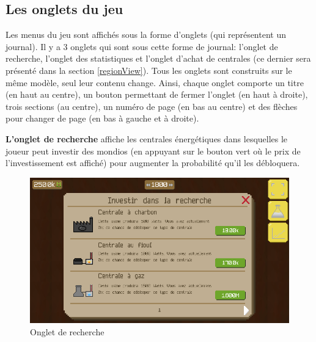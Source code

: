 \documentclass{article}
\begin{document}
		\subsection{Les onglets du jeu} \label{onglets}
		Les menus du jeu sont affichés sous la forme d'onglets (qui représentent un journal).
		Il y a 3 onglets qui sont sous cette forme de journal: l'onglet de recherche, l'onglet des statistiques et l'onglet d'achat de centrales (ce dernier sera présenté dans la section \ref{regionView}).
		Tous les onglets sont construits sur le même modèle, seul leur contenu change. Ainsi, chaque onglet comporte un titre (en haut au centre), un bouton permettant de fermer l'onglet (en haut à droite), trois sections (au centre), un numéro de page (en bas au centre) et des flèches pour changer de page (en bas à gauche et à droite).
		
		
		\textbf{L'onglet de recherche} affiche les centrales énergétiques dans lesquelles le joueur peut investir des mondios (en appuyant sur le bouton vert où le prix de l'investissement est affiché) pour augmenter la probabilité qu'il les débloquera.
		
		\begin{figure}[H]
                \includegraphics[width=\linewidth]{../images/recherche}
                \caption{Onglet de recherche}
                \label{fig:research}
        \end{figure}
        
\end{document}
